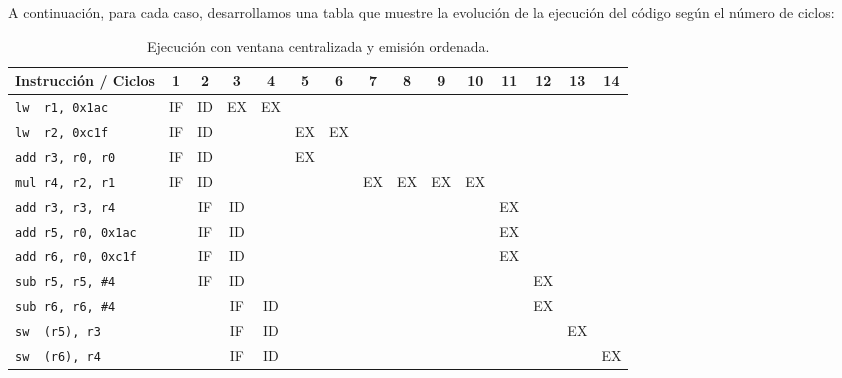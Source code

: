 \begin{ejercicio}
\begin{figure}[H]
\end{figure}

A continuación, para cada caso, desarrollamos una tabla que muestre la evolución de la ejecución del código según el número de ciclos:

\begin{table}[H]
\centering
\scriptsize
\begin{tabular}{|l|c|c|c|c|c|c|c|c|c|c|c|c|c|c|}
    \hline
    Instrucción / Ciclos & 1 & 2 & 3 & 4 & 5 & 6 & 7 & 8 & 9 & 10 & 11 & 12  & 13 & 14 \\
    \hline
    \verb|lw  r1, 0x1ac|     & IF & ID & EX & EX & & & & & & & & & & \\
    \hline        
    \verb|lw  r2, 0xc1f|     & IF & ID & & & EX & EX & & & & & & & & \\
    \hline           
    \verb|add r3, r0, r0|    & IF & ID & & & EX & & & & & & & & & \\
    \hline                        
    \verb|mul r4, r2, r1|    & IF & ID & & & & & EX & EX & EX & EX & & & & \\
    \hline            
    \verb|add r3, r3, r4|    & & IF & ID & & & & & & & & EX & & & \\
    \hline            
    \verb|add r5, r0, 0x1ac| & & IF & ID & & & & & & & & EX & & & \\
    \hline            
    \verb|add r6, r0, 0xc1f| & & IF & ID & & & & & & & & EX & & & \\
    \hline        
    \verb|sub r5, r5, #4|    & & IF & ID & & & & & & & & & EX & & \\
    \hline
    \verb|sub r6, r6, #4|    & & & IF & ID & & & & & & & & EX & & \\
    \hline
    \verb|sw  (r5), r3|      & & & IF & ID & & & & & & & & & EX & \\
    \hline          
    \verb|sw  (r6), r4|      & & & IF & ID & & & & & & & & & & EX \\
    \hline
\end{tabular}
\caption{Ejecución con ventana centralizada y emisión ordenada.}
\end{table}


\end{ejercicio}
